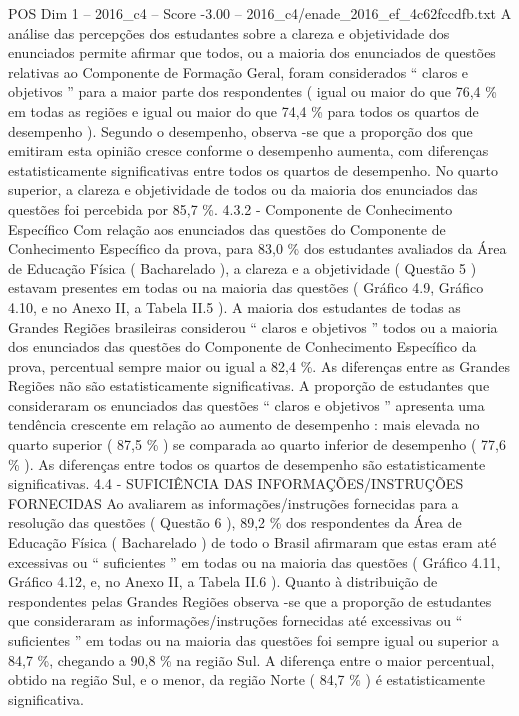 \begin{textsample}{POS Dim 1 – 2016\_c4 – Score -3.00 – 2016\_c4/enade\_2016\_ef\_4c62fccdfb.txt}
A análise das percepções dos estudantes sobre a clareza e objetividade dos enunciados permite afirmar que todos, ou a maioria dos enunciados de questões relativas ao Componente de Formação Geral, foram considerados “ claros e objetivos ” para a maior parte dos respondentes ( igual ou maior do que 76,4 \% em todas as regiões e igual ou maior do que 74,4 \% para todos os quartos de desempenho ).
Segundo o desempenho, observa -se que a proporção dos que emitiram esta opinião cresce conforme o desempenho aumenta, com diferenças estatisticamente significativas entre todos os quartos de desempenho.
No quarto superior, a clareza e objetividade de todos ou da maioria dos enunciados das questões foi percebida por 85,7 \%. 4.3.2 - Componente de Conhecimento Específico Com relação aos enunciados das questões do Componente de Conhecimento Específico da prova, para 83,0 \% dos estudantes avaliados da Área de Educação Física ( Bacharelado ), a clareza e a objetividade ( Questão 5 ) estavam presentes em todas ou na maioria das questões ( Gráfico 4.9, Gráfico 4.10, e no Anexo II, a Tabela II.5 ).
A maioria dos estudantes de todas as Grandes Regiões brasileiras considerou “ claros e objetivos ” todos ou a maioria dos enunciados das questões do Componente de Conhecimento Específico da prova, percentual sempre maior ou igual a 82,4 \%.
As diferenças entre as Grandes Regiões não são estatisticamente significativas.
A proporção de estudantes que consideraram os enunciados das questões “ claros e objetivos ” apresenta uma tendência crescente em relação ao aumento de desempenho : mais elevada no quarto superior ( 87,5 \% ) se comparada ao quarto inferior de desempenho ( 77,6 \% ).
As diferenças entre todos os quartos de desempenho são estatisticamente significativas. 4.4 - SUFICIÊNCIA DAS INFORMAÇÕES/INSTRUÇÕES FORNECIDAS Ao avaliarem as informações/instruções fornecidas para a resolução das questões ( Questão 6 ), 89,2 \% dos respondentes da Área de Educação Física ( Bacharelado ) de todo o Brasil afirmaram que estas eram até excessivas ou “ suficientes ” em todas ou na maioria das questões ( Gráfico 4.11, Gráfico 4.12, e, no Anexo II, a Tabela II.6 ).
Quanto à distribuição de respondentes pelas Grandes Regiões observa -se que a proporção de estudantes que consideraram as informações/instruções fornecidas até excessivas ou “ suficientes ” em todas ou na maioria das questões foi sempre igual ou superior a 84,7 \%, chegando a 90,8 \% na região Sul.
A diferença entre o maior percentual, obtido na região Sul, e o menor, da região Norte ( 84,7 \% ) é estatisticamente significativa.

\end{textsample}
